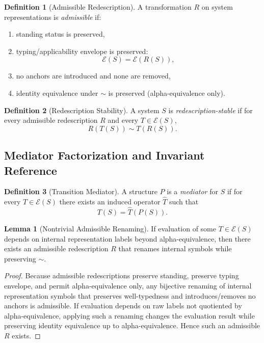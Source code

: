 \documentclass[11pt]{article}
\theoremstyle{definition}
\newtheorem{definition}{Definition}
\newtheorem{lemma}{Lemma}
\begin{document}
\begin{definition}[Admissible Redescription]
A transformation $R$ on system representations is \emph{admissible} if:
\begin{enumerate}[label=(\roman*)]
    \item standing status is preserved,
    \item typing/applicability envelope is preserved:
    \[
    \mathcal{E}(S)=\mathcal{E}(R(S)),
    \]
    \item no anchors are introduced and none are removed,
    \item identity equivalence under $\sim$ is preserved (alpha-equivalence only).
\end{enumerate}
\end{definition}

\begin{definition}[Redescription Stability]
A system $S$ is \emph{redescription-stable} if for every admissible redescription $R$ and every $T\in \mathcal{E}(S)$,
\[
R(T(S)) \sim T(R(S)).
\]
\end{definition}

\subsection{Mediator Factorization and Invariant Reference}

\begin{definition}[Transition Mediator]
A structure $P$ is a \emph{mediator} for $S$ if for every $T \in \mathcal{E}(S)$ there exists an induced operator $\widehat{T}$ such that
\[
T(S)=\widehat{T}(P(S)).
\]
\end{definition}

\begin{lemma}[Nontrivial Admissible Renaming]
If evaluation of some $T\in\mathcal{E}(S)$ depends on internal representation labels beyond
alpha-equivalence, then there exists an admissible redescription $R$ that renames internal symbols while preserving $\sim$.
\end{lemma}

\begin{proof}
Because admissible redescriptions preserve standing, preserve typing envelope, and permit alpha-equivalence only,
any bijective renaming of internal representation symbols that preserves well-typedness and introduces/removes no anchors
is admissible. If evaluation depends on raw labels not quotiented by alpha-equivalence, applying such a renaming changes the
evaluation result while preserving identity equivalence up to alpha-equivalence. Hence such an admissible $R$ exists.
\end{proof}
\end{document}
